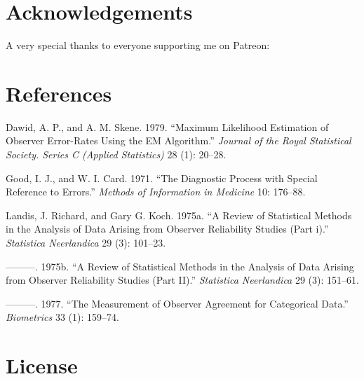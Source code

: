 \documentclass[
  letterpaper,
  DIV=11,
  numbers=noendperiod]{scrartcl}
\newlength{\cslhangindent}
\newlength{\cslentryspacingunit} %
\newenvironment{CSLReferences}[2] %
 {%
  \setlength{\parindent}{0pt}
  \ifodd #1
  \let\oldpar\par
  \def\par{\hangindent=\cslhangindent\oldpar}
  \fi
  \setlength{\parskip}{#2\cslentryspacingunit}
 }%
 {}
\begin{document}
\hypertarget{acknowledgements}{%
\section*{Acknowledgements}\label{acknowledgements}}

A very special thanks to everyone supporting me on Patreon:

\hypertarget{references}{%
\section*{References}\label{references}}

\hypertarget{refs}{}
\begin{CSLReferences}{1}{0}
\leavevmode{}%
Dawid, A. P., and A. M. Skene. 1979. {``Maximum Likelihood Estimation of
Observer Error-Rates Using the EM Algorithm.''} \emph{Journal of the
Royal Statistical Society. Series C (Applied Statistics)} 28 (1):
20--28.

\leavevmode{}%
Good, I. J., and W. I. Card. 1971. {``The Diagnostic Process with
Special Reference to Errors.''} \emph{Methods of Information in
Medicine} 10: 176--88.

\leavevmode{}%
Landis, J. Richard, and Gary G. Koch. 1975a. {``A Review of Statistical
Methods in the Analysis of Data Arising from Observer Reliability
Studies (Part i).''} \emph{Statistica Neerlandica} 29 (3): 101--23.

\leavevmode{}%
---------. 1975b. {``A Review of Statistical Methods in the Analysis of
Data Arising from Observer Reliability Studies (Part II).''}
\emph{Statistica Neerlandica} 29 (3): 151--61.

\leavevmode{}%
---------. 1977. {``The Measurement of Observer Agreement for
Categorical Data.''} \emph{Biometrics} 33 (1): 159--74.

\end{CSLReferences}

\hypertarget{license}{%
\section*{License}\label{license}}
\end{document}
